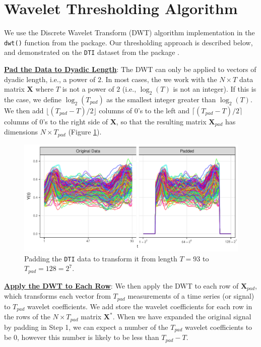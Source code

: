 \section{Wavelet Thresholding Algorithm}

We use the Discrete Wavelet Transform (DWT) algorithm implementation in the \texttt{dwt()} function from the   package.
Our thresholding approach is described below, and demonstrated on the \texttt{DTI} dataset from the   package \parencite{goldsmith_refund_2020}.

\begin{steps}
  \item \underline{\textbf{Pad the Data to Dyadic Length}}: The DWT can only be applied to vectors of dyadic length, i.e., a power of $2$. In most cases, the we work with the $N \times T$ data matrix $\mathbf{X}$ where $T$ is not a power of $2$ (i.e., $\log_2(T)$ is not an integer). If this is the case, we define $\log_2(T_{pad})$ as the smallest integer greater than $\log_2(T)$. We then add $\lfloor (T_{pad} - T)/2 \rfloor$ columns of $0$'s to the left and $\lceil (T_{pad} - T)/2 \rceil$ columns of $0$'s to the right side of $\mathbf{X}$, so that the resulting matrix $\mathbf{X}_{pad}$ has dimensions $N \times T_{pad}$ (Figure \ref{fig:DTI-padded}).
  \begin{figure}[H]
      \centering
      \includegraphics[width=0.75\linewidth]{figures/DTI-padded.pdf}
      \caption{Padding the \texttt{DTI} data to transform it from length $T = 93$ to $T_{pad} = 128 = 2^7$.}
      \label{fig:DTI-padded}
  \end{figure}
  \item \underline{\textbf{Apply the DWT to Each Row}}: We then apply the DWT to each row of $\mathbf{X}_{pad}$, which transforms each vector from $T_{pad}$ measurements of a time series (or signal) to $T_{pad}$ wavelet coefficients. 
  We add store the wavelet coefficients for each row in the rows of the $N \times T_{pad}$ matrix $\mathbf{X}^*$.
  When we have expanded the original signal by padding in Step 1, we can expect a number of the $T_{pad}$ wavelet coefficients to be $0$, however this number is likely to be less than $T_{pad} - T$.

\end{steps}
